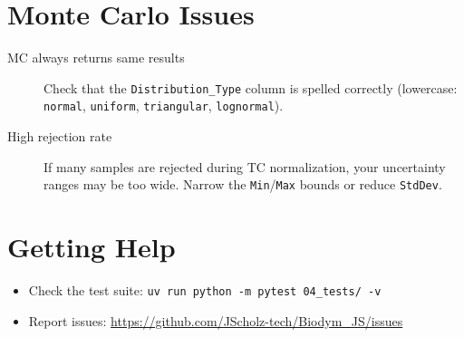 \section{Monte Carlo Issues}

\begin{description}
  \item[MC always returns same results] Check that the \texttt{Distribution\_Type} column is spelled correctly (lowercase: \texttt{normal}, \texttt{uniform}, \texttt{triangular}, \texttt{lognormal}).

  \item[High rejection rate] If many samples are rejected during TC normalization, your uncertainty ranges may be too wide. Narrow the \texttt{Min}/\texttt{Max} bounds or reduce \texttt{StdDev}.
\end{description}

\section{Getting Help}

\begin{itemize}
  \item Check the test suite: \texttt{uv run python -m pytest 04\_tests/ -v}
  \item Report issues: \url{https://github.com/JScholz-tech/Biodym_JS/issues}
\end{itemize}
